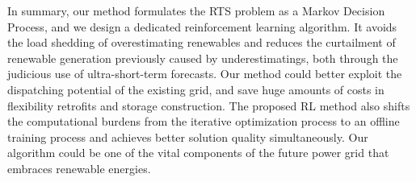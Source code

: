 In summary, our method formulates the RTS problem as a Markov Decision Process, and we design a dedicated reinforcement learning algorithm. It avoids the load shedding of overestimating renewables and reduces the curtailment of renewable generation previously caused by underestimatings, both through the judicious use of ultra-short-term forecasts. Our method could better exploit the dispatching potential of the existing grid, and save huge amounts of costs in flexibility retrofits and storage construction. The proposed RL method also shifts the computational burdens from the iterative optimization process to an offline training process and achieves better solution quality simultaneously. Our algorithm could be one of the vital components of the future power grid that embraces renewable energies. 


